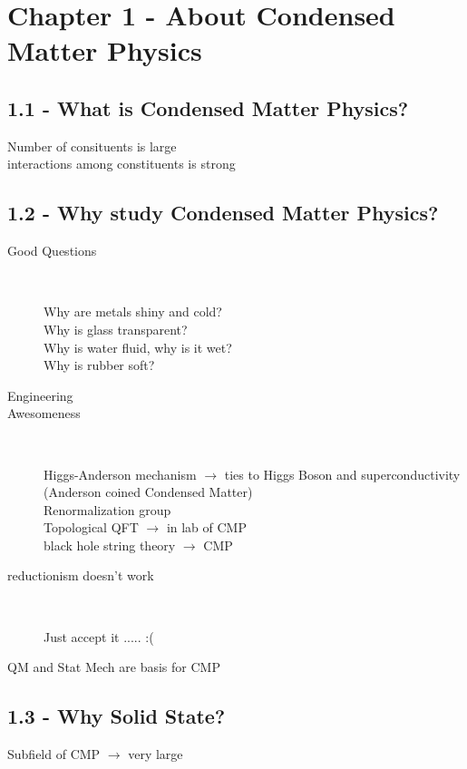 	\section{Chapter 1 - About Condensed Matter Physics}
		\subsection{1.1 - What is Condensed Matter Physics?}
			\begin{description}
				\item[Number of consituents is large]
				\item[interactions among constituents is strong]
			\end{description}
		\subsection{1.2 - Why study Condensed Matter Physics?}
			\begin{description}
				\item[Good Questions] \

					Why are metals shiny and cold? \\
					Why is glass transparent? \\
					Why is water fluid, why is it wet? \\
					Why is rubber soft?\\
				\item[Engineering] 
	
				\item[Awesomeness] \

					Higgs-Anderson mechanism $\rightarrow$ ties to Higgs Boson and superconductivity (Anderson coined Condensed Matter) \\
					Renormalization group \\
					Topological QFT $\rightarrow$ in lab of CMP \\
					black hole string theory $\rightarrow$ CMP
				\item[reductionism doesn't work] \

					Just accept it ..... :(
				\item[QM and Stat Mech are basis for CMP] 
			\end{description}
			
		\subsection{1.3 - Why Solid State?}
			Subfield of CMP $\rightarrow$ very large